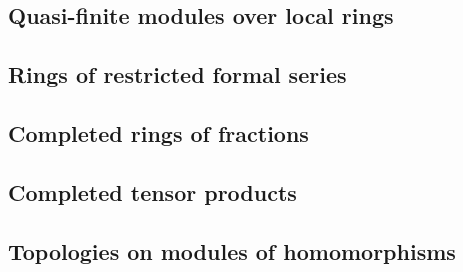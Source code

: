 \subsection{Quasi-finite modules over local rings}
\label{0-prelim-7.4}

\subsection{Rings of restricted formal series}
\label{0-prelim-7.5}

\subsection{Completed rings of fractions}
\label{0-prelim-7.6}

\subsection{Completed tensor products}
\label{0-prelim-7.7}

\subsection{Topologies on modules of homomorphisms}
\label{0-prelim-7.8}

